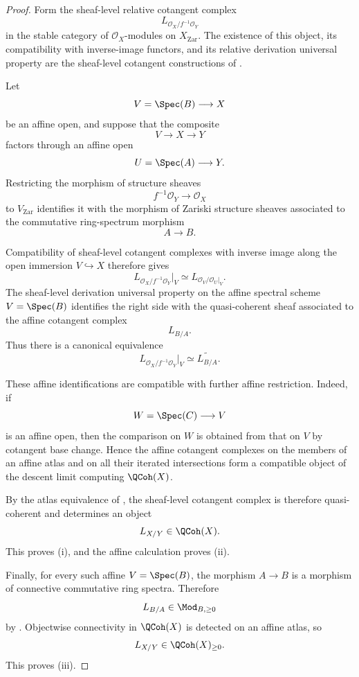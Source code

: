 \begin{proof}
Form the sheaf-level relative cotangent complex
\[
    L_{\mathcal O_X/f^{-1}\mathcal O_Y}
\]
in the stable category of \(\mathcal O_X\)-modules on
\(X_{\mathrm{Zar}}\). The existence of this object, its compatibility
with inverse-image functors, and its relative derivation universal
property are the sheaf-level cotangent constructions of
\cite[Sections~17.1.1--17.1.2]{LurieSAG}.

Let
\[
    V=\Spec(B)
    \longrightarrow
    X
\]
be an affine open, and suppose that the composite
\[
    V
    \longrightarrow
    X
    \longrightarrow
    Y
\]
factors through an affine open
\[
    U=\Spec(A)
    \longrightarrow
    Y.
\]
Restricting the morphism of structure sheaves
\[
    f^{-1}\mathcal O_Y
    \longrightarrow
    \mathcal O_X
\]
to \(V_{\mathrm{Zar}}\) identifies it with the morphism of Zariski
structure sheaves associated to the commutative ring-spectrum morphism
\[
    A
    \longrightarrow
    B.
\]

Compatibility of sheaf-level cotangent complexes with inverse image
along the open immersion \(V\hookrightarrow X\) therefore gives
\[
    L_{\mathcal O_X/f^{-1}\mathcal O_Y}|_V
    \simeq
    L_{\mathcal O_V/\mathcal O_U|_V}.
\]
The sheaf-level derivation universal property on the affine spectral
scheme \(V=\Spec(B)\) identifies the right side with the quasi-coherent
sheaf associated to the affine cotangent complex
\[
    L_{B/A}.
\]
Thus there is a canonical equivalence
\[
    L_{\mathcal O_X/f^{-1}\mathcal O_Y}|_V
    \simeq
    \widetilde{L_{B/A}}.
\]

These affine identifications are compatible with further affine
restriction. Indeed, if
\[
    W=\Spec(C)
    \longrightarrow
    V
\]
is an affine open, then the comparison on \(W\) is obtained from that on
\(V\) by cotangent base change. Hence the affine cotangent complexes on
the members of an affine atlas and on all their iterated intersections
form a compatible object of the descent limit computing
\(\QCoh(X)\).

By the atlas equivalence of
, the sheaf-level cotangent complex is
therefore quasi-coherent and determines an object
\[
    L_{X/Y}
    \in
    \QCoh(X).
\]
This proves \textup{(i)}, and the affine calculation proves
\textup{(ii)}.

Finally, for every such affine \(V=\Spec(B)\), the morphism
\(A\to B\) is a morphism of connective commutative ring spectra.
Therefore
\[
    L_{B/A}
    \in
    \Mod_{B,\geq0}
\]
by . Objectwise
connectivity in \(\QCoh(X)\) is detected on an affine atlas, so
\[
    L_{X/Y}
    \in
    \QCoh(X)_{\geq0}.
\]
This proves \textup{(iii)}.
\end{proof}

